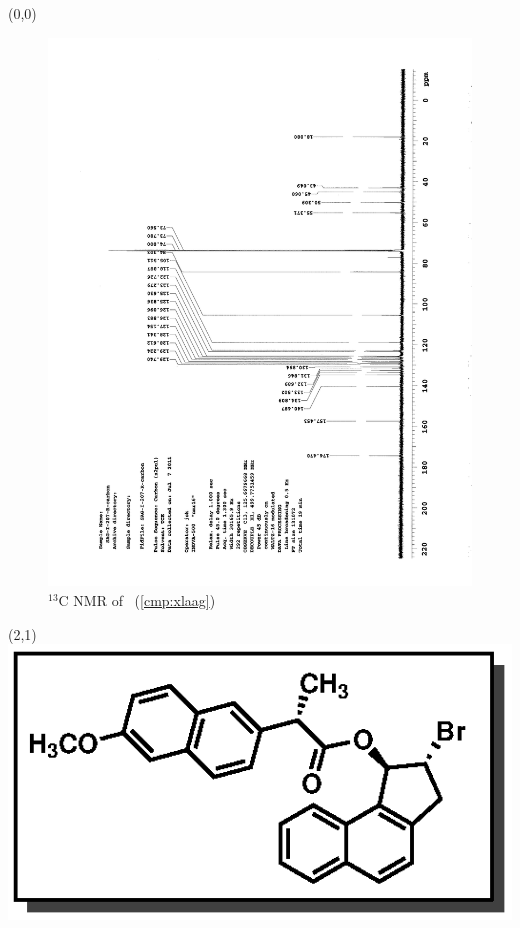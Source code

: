\clearpage
\begin{textblock}{20}(0,0)
\begin{figure}[htb]
\caption{$^{13}$C NMR of  \CMPxlaag\ (\ref{cmp:xlaag})}
\includegraphics[scale=0.75, trim = 0mm 0mm 0mm 5mm,
clip]{chp_asymmetric/images/nmr/xlaagC}
\vspace{-100pt}
\end{figure}
\end{textblock}
\begin{textblock}{1}(2,1)
\includegraphics[scale=0.8, angle=90]{chp_asymmetric/images/xlaag}
\end{textblock}
\clearpage

